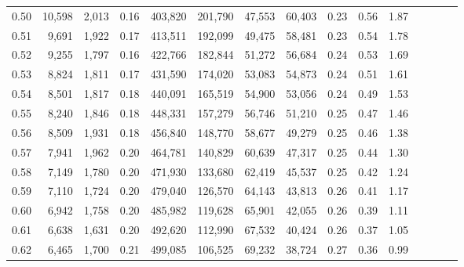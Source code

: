 \begin{tabular}{rrrcrrrrrrrrrrr}
0.50 &  10,598 &  2,013 &                                       0.16 &  403,820 &  201,790 &   47,553 &   60,403 &  0.23 &  0.56 &                         1.87 \\
0.51 &   9,691 &  1,922 &                                       0.17 &  413,511 &  192,099 &   49,475 &   58,481 &  0.23 &  0.54 &                         1.78 \\
0.52 &   9,255 &  1,797 &                                       0.16 &  422,766 &  182,844 &   51,272 &   56,684 &  0.24 &  0.53 &                         1.69 \\
0.53 &   8,824 &  1,811 &                                       0.17 &  431,590 &  174,020 &   53,083 &   54,873 &  0.24 &  0.51 &                         1.61 \\
0.54 &   8,501 &  1,817 &                                       0.18 &  440,091 &  165,519 &   54,900 &   53,056 &  0.24 &  0.49 &                         1.53 \\
0.55 &   8,240 &  1,846 &                                       0.18 &  448,331 &  157,279 &   56,746 &   51,210 &  0.25 &  0.47 &                         1.46 \\
0.56 &   8,509 &  1,931 &                                       0.18 &  456,840 &  148,770 &   58,677 &   49,279 &  0.25 &  0.46 &                         1.38 \\
0.57 &   7,941 &  1,962 &                                       0.20 &  464,781 &  140,829 &   60,639 &   47,317 &  0.25 &  0.44 &                         1.30 \\
0.58 &   7,149 &  1,780 &                                       0.20 &  471,930 &  133,680 &   62,419 &   45,537 &  0.25 &  0.42 &                         1.24 \\
0.59 &   7,110 &  1,724 &                                       0.20 &  479,040 &  126,570 &   64,143 &   43,813 &  0.26 &  0.41 &                         1.17 \\
0.60 &   6,942 &  1,758 &                                       0.20 &  485,982 &  119,628 &   65,901 &   42,055 &  0.26 &  0.39 &                         1.11 \\
0.61 &   6,638 &  1,631 &                                       0.20 &  492,620 &  112,990 &   67,532 &   40,424 &  0.26 &  0.37 &                         1.05 \\
0.62 &   6,465 &  1,700 &                                       0.21 &  499,085 &  106,525 &   69,232 &   38,724 &  0.27 &  0.36 &                         0.99 \\

\end{tabular}
